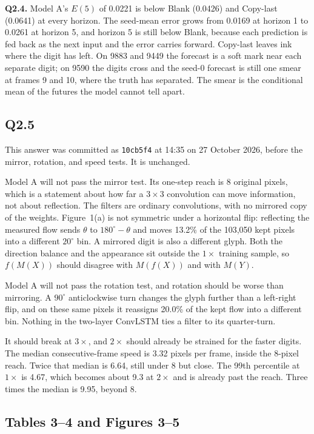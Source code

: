 \documentclass[11pt,a4paper]{article}
\begin{document}
\textbf{Q2.4.} Model A's \(E(5)\) of 0.0221 is below Blank (0.0426) and Copy-last (0.0641) at every horizon. The seed-mean error grows from 0.0169 at horizon 1 to 0.0261 at horizon 5, and horizon 5 is still below Blank, because each prediction is fed back as the next input and the error carries forward. Copy-last leaves ink where the digit has left. On 9883 and 9449 the forecast is a soft mark near each separate digit; on 9590 the digits cross and the seed-0 forecast is still one smear at frames 9 and 10, where the truth has separated. The smear is the conditional mean of the futures the model cannot tell apart.

\subsection{Q2.5}

This answer was committed as \texttt{10cb5f4} at 14:35 on 27 October 2026, before the mirror, rotation, and speed tests. It is unchanged.

Model A will not pass the mirror test. Its one-step reach is 8 original pixels, which is a statement about how far a \(3\times 3\) convolution can move information, not about reflection. The filters are ordinary convolutions, with no mirrored copy of the weights. Figure~1(a) is not symmetric under a horizontal flip: reflecting the measured flow sends \(\theta\) to \(180^{\circ}-\theta\) and moves 13.2\% of the 103{,}050 kept pixels into a different \(20^{\circ}\) bin. A mirrored digit is also a different glyph. Both the direction balance and the appearance sit outside the \(1\times\) training sample, so \(f(M(X))\) should disagree with \(M(f(X))\) and with \(M(Y)\).

Model A will not pass the rotation test, and rotation should be worse than mirroring. A \(90^{\circ}\) anticlockwise turn changes the glyph further than a left-right flip, and on these same pixels it reassigns 20.0\% of the kept flow into a different bin. Nothing in the two-layer ConvLSTM ties a filter to its quarter-turn.

It should break at \(3\times\), and \(2\times\) should already be strained for the faster digits. The median consecutive-frame speed is 3.32 pixels per frame, inside the 8-pixel reach. Twice that median is 6.64, still under 8 but close. The 99th percentile at \(1\times\) is 4.67, which becomes about 9.3 at \(2\times\) and is already past the reach. Three times the median is 9.95, beyond 8.

\subsection{Tables 3--4 and Figures 3--5}
\end{document}
